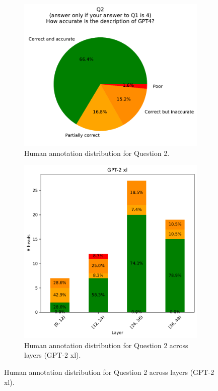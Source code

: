 \documentclass[11pt]{article}
\newcommand{\GPTxl}{GPT-2 xl}
\begin{document}
\begin{figure}[tp]
    \centering
    \begin{subfigure}{\columnwidth}
    \centering
    \includegraphics[scale=0.45]
        {figures/human_validation/q2_pie}
        \caption{Human annotation distribution for Question 2.}
    \end{subfigure}

    \begin{subfigure}{\columnwidth}
        \includegraphics[scale=0.45]
        {figures/human_validation/q2_by_layer_gpt}
        \caption{Human annotation distribution for Question 2 across layers (\GPTxl{}).}
    \end{subfigure}


\end{figure}
\end{document}
